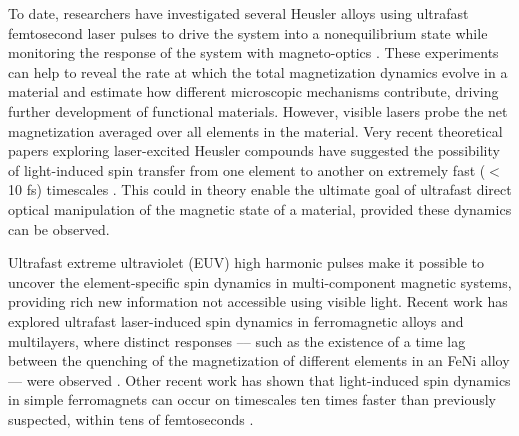 To date, researchers have investigated several Heusler alloys using ultrafast femtosecond laser pulses to drive the system into a nonequilibrium state while monitoring the response of the system with magneto-optics \cite{Muller2009, Mann2012,Steil2010,Wustenberg2011}. These experiments can help to reveal the rate at which the total magnetization dynamics evolve in a material and estimate how different microscopic mechanisms contribute, driving further development of functional materials. However, visible lasers probe the net magnetization averaged over all elements in the material. Very recent theoretical papers exploring laser-excited Heusler compounds have suggested the possibility of light-induced spin transfer from one element to another on extremely fast ($<$10 fs) timescales \cite{Dewhurst2018,Elliott2016}. This could in theory enable the ultimate goal of ultrafast direct optical manipulation of the magnetic state of a material, provided these dynamics can be observed.

Ultrafast extreme ultraviolet (EUV) high harmonic pulses make it possible to uncover the element-specific spin dynamics in multi-component magnetic systems, providing rich new information not accessible using visible light. Recent work has explored ultrafast laser-induced spin dynamics in ferromagnetic alloys and multilayers, where distinct responses –– such as the existence of a time lag between the quenching of the magnetization of different elements in an FeNi alloy –– were observed \cite{Mathias2012}. Other recent work has shown that light-induced spin dynamics in simple ferromagnets can occur on timescales ten times faster than previously suspected, within tens of femtoseconds \cite{Gort2018,Tengdin2018}. 